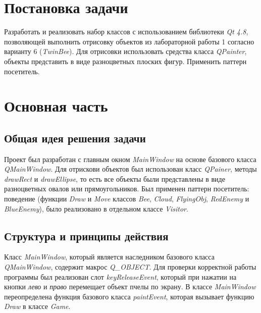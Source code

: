 \documentclass[a4paper,14pt]{article}
\begin{document}

\setcounter{page}{2} %

\renewcommand\contentsname{\centering {\normalsize Содержание}}
\tableofcontents
\newpage

\section*{Постановка задачи}

Разработать и реализовать набор классов с использованием библиотеки \textit{Qt 4.8}, позволяющей выполнить отрисовку объектов из лабораторной работы 1 согласно варианту 6 (\textit{TwinBee}). Для отрисовки использовать средства класса \textit{QPainter}, объекты представить в виде разноцветных плоских фигур. Применить паттерн посетитель.


\newpage

\section{Основная часть}
\subsection{Общая идея решения задачи}
Проект был разработан с главным окном \textit{MainWindow} на основе базового класса \textit{QMainWindow}. Для отрискови объектов был использован класс \textit{QPainer}, методы \\ \textit{drawRect} и \textit{drawEllipse}, то есть все объекты были представлены в виде разноцветных овалов или прямоугольников. Был применен паттерн посетитель: поведение (функции \textit{Draw} и \textit{Move} классов  \textit{Bee}, \textit{Cloud}, \textit{FlyingObj}, \textit{RedEnemy} и \textit{BlueEnemy}), было реализовано в отдельном классе \textit{Visitor}.
\subsection{Структура и принципы действия}
Класс \textit{MainWindow}, который является наследником базового класса \textit{QMainWindow}, содержит макрос \textit{Q\_OBJECT}. Для проверки корректной работы программы был реализован слот \textit{keyReleaseEvent}, который при нажатии на кнопки \textit{лево} и \textit{право} перемещает объект пчелы по экрану. В классе \textit{MainWindow} переопределена функция базового класса \textit{paintEvent}, которая вызывает функцию \textit{Draw} в классе \textit{Game}.
\end{document}

